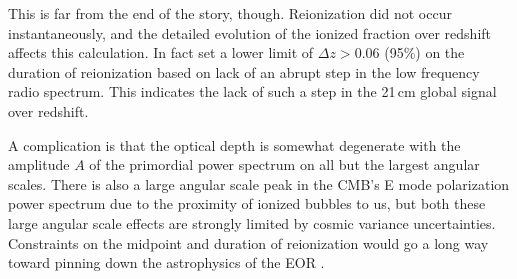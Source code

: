 This is far from the end of the story, though. Reionization did not occur instantaneously, and the detailed evolution of the ionized fraction over redshift affects this calculation. In fact \citet{bowman2010} set a lower limit of $\Delta z>0.06$ (95\%) on the duration of reionization based on lack of an abrupt step in the low frequency radio spectrum. This indicates the lack of such a step in the 21\,cm global signal over redshift. 

A complication is that the optical depth is somewhat degenerate with the amplitude $A$ of the primordial power spectrum on all but the largest angular scales. There is also a large angular scale peak in the CMB's E mode polarization power spectrum due to the proximity of ionized bubbles to us, but both these large angular scale effects are strongly limited by cosmic variance uncertainties. Constraints on the midpoint and duration of reionization would go a long way toward pinning down the astrophysics of the EOR \citep{liu15a}.

